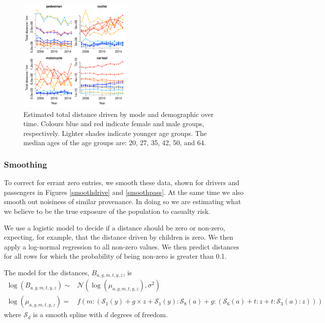 \documentclass{article}
\begin{document}
\begin{figure}[H]
\centering
\includegraphics[width=0.5\textwidth]{NTStrajectoriesperson.pdf}
\caption{\small Estimated total distance driven by mode and demographic over time. Colours blue and red indicate female and male groups, respectively. Lighter shades indicate younger age groups. The median ages of the age groups are: 20, 27, 35, 42, 50, and 64.}
\label{NTStrajectoriesperson}
\end{figure}

\subsubsection{Smoothing}\label{smooth}

To correct for errant zero entries, we smooth these data, shown for drivers and passengers in Figures \ref{smoothdrive} and \ref{smoothpass}. At the same time we also smooth out noisiness of similar provenance. In doing so we are estimating what we believe to be the true exposure of the population to casualty risk.

We use a logistic model to decide if a distance should be zero or non-zero, expecting, for example, that the distance driven by children is zero. We then apply a log-normal regression to all non-zero values. We then predict distances for all rows for which the probability of being non-zero is greater than 0.1.

The model for the distances, $B_{a,g,m,t,y,z}$, is
\begin{align}
\log({B}_{a,g,m,t,y,z}) \sim & \mathcal{N}(\log(\mu_{a,g,m,t,y,z}),\sigma^2)\label{smoothEq}\\
\log(\mu_{a,g,m,t,y,z}) =& f(m:(\mathcal{S}_1(y)+g\times z+\mathcal{S}_1(y):\mathcal{S}_8(a)+g:(\mathcal{S}_6(a)+t:z+t:\mathcal{S}_3(a):z)))
\end{align}
where $\mathcal{S}_d$ is a smooth spline with $d$ degrees of freedom.
\end{document}
